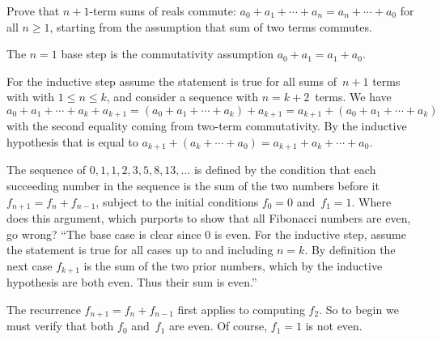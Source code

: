 \documentclass{ibl}  %
\begin{document}
\begin{problem}

\end{problem}

\begin{problem}
Prove that $n+1$-term sums of reals commute:
$a_0+a_1+\cdots+a_n=a_n+\cdots+a_0$ for all $n\geq 1$,
starting from the assumption that sum of two terms commutes.
\begin{answer}
The $n=1$ base step is the commutativity assumption $a_0+a_1=a_1+a_0$.

For the inductive step assume the statement is true for all 
sums of~$n+1$ terms with 
with $1\leq n\leq k$, and consider a sequence with $n=k+2$~terms.
We have 
$a_0+a_1+\cdots+a_k+a_{k+1}
=(a_0+a_1+\cdots+a_k)+a_{k+1}
=a_{k+1}+(a_0+a_1+\cdots+a_k)$ with the second equality coming from
two-term commutativity.
By the inductive hypothesis that is equal to 
$a_{k+1}+(a_k+\cdots+a_0)=a_{k+1}+a_k+\cdots+a_0$.
\end{answer}
\end{problem}

\begin{problem}[\maxlength]
The sequence of 
$0,1,1,2,3,5,8,13, \ldots$ is defined by the condition that 
each succeeding number in the sequence is the sum of the 
two numbers before it $f_{n+1}=f_n+f_{n-1}$, subject to the initial conditions
$f_0=0$ and~$f_1=1$.
Where does this argument, which purports to show that
all Fibonacci numbers are even, go wrong?
``The base case is clear since $0$ is even.  
For the inductive step, assume the statement 
is true for all cases up to and including $n=k$.
By definition 
the next case $f_{k+1}$ is the sum of the two prior numbers, which by
the inductive hypothesis are both even.  
Thus their sum is even.''   
\begin{answer}
The recurrence $f_{n+1}=f_n+f_{n-1}$ first applies to computing $f_2$.
So to begin we must verify that both $f_0$ and~$f_1$ are even.
Of course, $f_1=1$ is not even.
\end{answer}
\end{problem}
\end{document}
